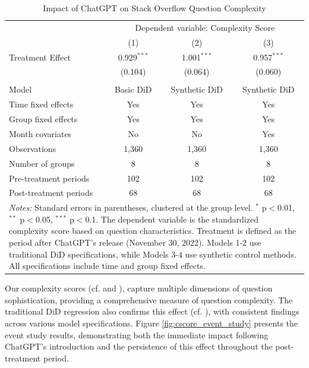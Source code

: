 \begin{table}[H]
    \centering
    \caption{Impact of ChatGPT on Stack Overflow Question Complexity}
    \label{tab:csscore_did_results}
    \begin{tabular}{lccc}
    \toprule
    & \multicolumn{3}{c}{Dependent variable: Complexity Score} \\
    \cmidrule(lr){2-4}
    & (1) & (2) & (3) \\
    \midrule
    Treatment Effect         & 0.929$^{***}$ & 1.001$^{***}$ & 0.957$^{***}$ \\
    & (0.104)       & (0.064)       & (0.060) \\
    &               &               & \\
    \midrule
    Model                    & Basic DiD     & Synthetic DiD & Synthetic DiD \\
    Time fixed effects       & Yes           & Yes           & Yes \\
    Group fixed effects      & Yes           & Yes           & Yes \\
    Month covariates         & No            & No            & Yes \\
    \midrule
    Observations             & 1,360         & 1,360         & 1,360 \\
    Number of groups         & 8             & 8             & 8 \\
    Pre-treatment periods    & 102           & 102           & 102 \\
    Post-treatment periods   & 68            & 68            & 68 \\
    \bottomrule
    \multicolumn{4}{p{1\linewidth}}{\footnotesize \textit{Notes:} Standard errors in parentheses, clustered at the group level. $^{*}$ p$<$0.01, $^{**}$ p$<$0.05, $^{***}$ p$<$0.1. The dependent variable is the standardized complexity score based on question characteristics. Treatment is defined as the period after ChatGPT's release (November 30, 2022). Models 1-2 use traditional DiD specifications, while Models 3-4 use synthetic control methods. All specifications include time and group fixed effects.} \\
    \end{tabular}
\end{table}

Our complexity scores (cf.  and ), capture multiple dimensions of question sophistication, providing a comprehensive measure of question complexity. The traditional DiD regression also confirms this effect (cf. ), with consistent findings across various model specifications. Figure \ref{fig:cscore_event_study} presents the event study results, demonstrating both the immediate impact following ChatGPT's introduction and the persistence of this effect throughout the post-treatment period. 

